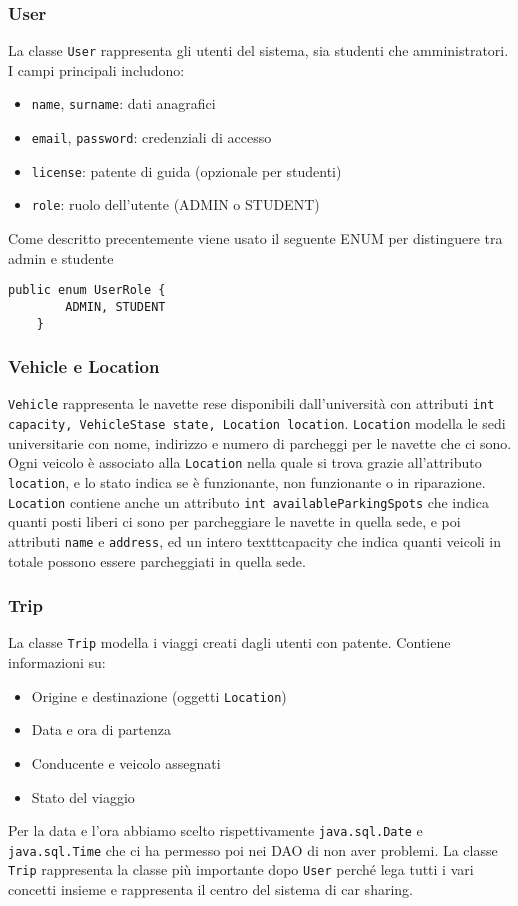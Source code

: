 \subsubsection{User}
La classe \texttt{User} rappresenta gli utenti del sistema, sia studenti che amministratori. I campi principali includono:
\begin{itemize}
\item \texttt{name}, \texttt{surname}: dati anagrafici
\item \texttt{email}, \texttt{password}: credenziali di accesso
\item \texttt{license}: patente di guida (opzionale per studenti)
\item \texttt{role}: ruolo dell'utente (ADMIN o STUDENT)
\end{itemize}
Come descritto precentemente viene usato il seguente ENUM per distinguere tra admin e studente
\begin{lstlisting}[style=java, caption={UserRole ENUM}]
public enum UserRole {
        ADMIN, STUDENT 
    }
\end{lstlisting}

\subsubsection{Vehicle e Location}
\texttt{Vehicle} rappresenta le navette rese disponibili dall'università con attributi \texttt{int capacity, VehicleStase state, Location location}. \texttt{Location} modella le sedi universitarie con nome, indirizzo e numero di parcheggi per le navette che ci sono.
Ogni veicolo è associato alla \texttt{Location} nella quale si trova grazie all'attributo \texttt{location}, e lo stato indica se è funzionante, non funzionante o in riparazione.\\
\texttt{Location} contiene anche un attributo \texttt{int availableParkingSpots} che indica quanti posti liberi ci sono per parcheggiare le navette in quella sede, e poi attributi \texttt{name} e \texttt{address}, ed un intero texttt{capacity} che indica quanti veicoli in totale possono essere parcheggiati in quella sede.
\subsubsection{Trip}
La classe \texttt{Trip} modella i viaggi creati dagli utenti con patente. Contiene informazioni su:
\begin{itemize}
\item Origine e destinazione (oggetti \texttt{Location})
\item Data e ora di partenza
\item Conducente e veicolo assegnati
\item Stato del viaggio
\end{itemize}
Per la data e l'ora abbiamo scelto rispettivamente \texttt{java.sql.Date} e \texttt{java.sql.Time} che ci ha permesso poi nei DAO di non aver problemi.
La classe \texttt{Trip} rappresenta la classe più importante dopo \texttt{User} perché lega tutti i vari concetti insieme e rappresenta il centro del sistema di car sharing.
